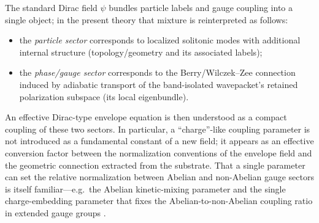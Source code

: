 The standard Dirac field $\psi$ bundles particle labels and gauge coupling into a single object;
in the present theory that mixture is reinterpreted as follows:
\begin{itemize}
\item the \emph{particle sector} corresponds to localized solitonic modes with additional internal structure
(topology/geometry and its associated labels);
\item the \emph{phase/gauge sector} corresponds to the Berry/Wilczek--Zee connection induced by adiabatic transport
of the band-isolated wavepacket's retained polarization subspace (its local eigenbundle).
\end{itemize}
An effective Dirac-type envelope equation is then understood as a compact coupling of these two sectors.
In particular, a ``charge''-like coupling parameter is not introduced as a fundamental constant of a new field;
it appears as an effective conversion factor between the normalization conventions of the envelope field and the
geometric connection extracted from the substrate.
That a single parameter can set the relative normalization between Abelian and non-Abelian gauge sectors is itself
familiar---e.g.\ the Abelian kinetic-mixing parameter \citep{Holdom1986KineticMixing,Fabbrichesi2021DarkPhoton} and
the single charge-embedding parameter that fixes the Abelian-to-non-Abelian coupling ratio in extended gauge groups
\citep{Hati2017LeftRight3331}.
